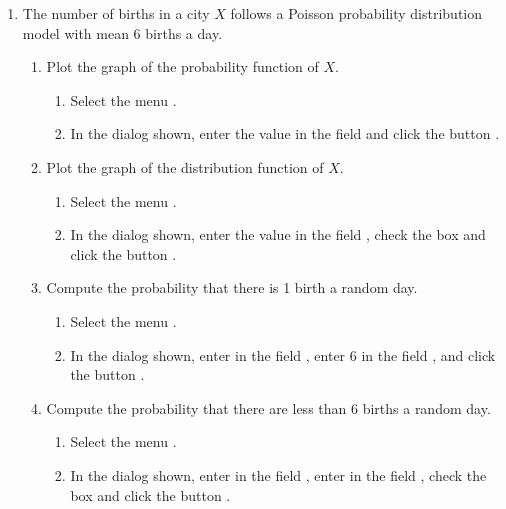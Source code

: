 \begin{enumerate}[leftmargin=*]
\item The number of births in a city $X$ follows a Poisson probability distribution model with mean 6 births a day.
\begin{enumerate}
\item Plot the graph of the probability function of $X$.
\begin{indication}
\begin{enumerate}
\item Select the menu .
\item In the dialog shown, enter the value  in the field  and click the button .
\end{enumerate}
\end{indication}

\item Plot the graph of the distribution function of $X$.
\begin{indication}
\begin{enumerate}
\item Select the menu .
\item In the dialog shown, enter the value  in the field , check the box  and click the button .
\end{enumerate}
\end{indication}

\item Compute the probability that there is 1 birth a random day.  
\begin{indication}
\begin{enumerate}
\item Select the menu .
\item In the dialog shown, enter  in the field , enter 6 in the field , and click the button .
\end{enumerate}
\end{indication}

\item Compute the probability that there are less than 6 births a random day.
\begin{indication}
\begin{enumerate}
\item Select the menu .
\item In the dialog shown, enter  in the field , enter  in the field
, check the box  and click the button .
\end{enumerate}
\end{indication}


\end{enumerate}
\end{enumerate}
